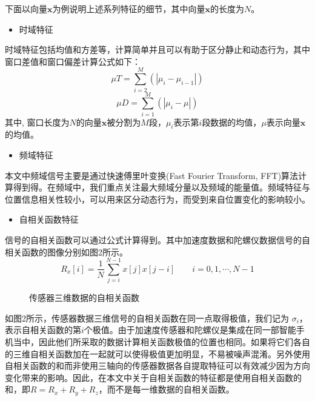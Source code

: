 下面以向量$\textbf{x}$为例说明上述系列特征的细节，其中向量$\textbf{x}$的长度为$N$。
\begin{itemize}
	\item 时域特征
\end{itemize}
\par 时域特征包括均值和方差等，计算简单并且可以有助于区分静止和动态行为，其中窗口差值和窗口偏差计算公式如下：
\begin{equation}
	\mu T = \sum_{i=2}^{M}(|\mu_i - \mu_{i-1}|)
\end{equation}
\begin{equation}
	\mu D = \sum_{i=1}^{M}(|\mu_i - \mu|)
\end{equation}
其中, 窗口长度为$N$的向量$\textbf{x}$被分割为$M$段，$\mu_i$表示第$i$段数据的均值，$\mu$表示向量$\textbf{x}$的均值。
\begin{itemize}
	\item 频域特征
\end{itemize}
\par 本文中频域信号主要是通过快速傅里叶变换(Fast Fourier Transform, FFT)算法计算得到得。在频域中，我们重点关注最大频域分量以及频域的能量值。频域特征与位置信息相关性较小，可以用来区分动态行为，而受到来自位置变化的影响较小。
\begin{itemize}
	\item 自相关函数特征
\end{itemize}
\par 信号的自相关函数可以通过公式计算得到。其中加速度数据和陀螺仪数据信号的自相关函数的图像分别如图2所示。
\begin{equation}
	R_x[i]=\frac{1}{N}\sum_{j=i}^{N-1} x[j]x[j-i]\qquad  i=0, 1, \cdots, N-1
\end{equation}
\begin{figure}[!htb]
    \centering
    \caption{传感器三维数据的自相关函数}
\end{figure}

\par 如图2所示，传感器数据三维信号的自相关函数在同一点取得极值，我们记为 $\sigma_i$，表示自相关函数的第$i$个极值。由于加速度传感器和陀螺仪是集成在同一部智能手机当中，因此他们所采取的数据计算相关函数极值的位置也相同。如果将它们各自的三维自相关函数加在一起就可以使得极值更加明显，不易被噪声混淆。另外使用自相关函数的和而非使用三轴向的传感器数据各自提取特征可以有效减少因为方向变化带来的影响。因此，在本文中关于自相关函数的特征都是使用自相关函数的和，即$R = R_x + R_y + R_z$，而不是每一维数据的自相关函数。


